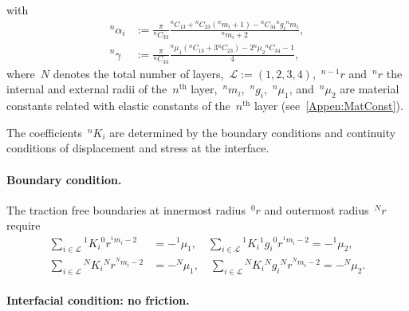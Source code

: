 \documentclass[preprint,10pt,times]{elsarticle}
\numberwithin{equation}{section}
\newcommand{\pr}[1]{\left( #1 \right)}
\renewcommand{\>}{$\Rightarrow$}
\begin{document}
with
\begin{subequations}
	\begin{align}
	{}^{n}\!{\alpha_{i}} & := \frac{\pi}{{}^{n}\!{C_{33}}} \frac{  {}^{n}\!{C_{13}} + {}^{n}\!{C_{23}}({}^{n}\!{m_{i}} + 1) - {}^{n}\!{C_{34}} {}^{n}\!{g_{i}} {}^{n}\!{m_{i}} }{{}^{n}\!{m_{i}}+2}, \\
	{}^{n}\!\gamma & := \frac{\pi}{{}^{n}\!{C_{33}}} \frac{ {}^{n}\!{\mu_{1}} ({}^{n}\!{C_{13}} + 3{}^{n}\!{C_{23}}) - 2{}^{n}\!{\mu_{2}} {}^{n}\!{C_{34}} - 1  }{4},
	\end{align}
\end{subequations}
where~$N$ denotes the total number of layers,~$\mathcal{L} := \pr{1,2,3,4}$,~${}^{n-1}\!{r}$ and~${}^{n}\!{r}$ the internal and external radii of the~$n^\text{th}$ layer,~${}^{n}\!{m_{i}}$,~${}^{n}\!{g_{i}}$,~${}^{n}\!{\mu_{1}}$, and~${}^{n}\!{\mu_{2}}$ are material constants related with elastic constants of the~$n^\text{th}$ layer (see~\ref{Appen:MatConst}).

The coefficients~${}^{n}\!{K_{i}}$ are determined by the boundary conditions and continuity conditions of displacement and stress at the interface.

\paragraph{Boundary condition.}

The traction free boundaries at innermost radius~${}^{0}\!{r}$ and outermost radius~${}^{N}\!{r}$ require
\begin{subequations}
	\begin{align}
	\sum_{i \in \mathcal{L}} {}^{1}\!{K_{i}} {}^{0}\!{r}^{{}^{1}\!{m_{i}}-2} & = -{}^{1}\!{\mu_{1}}, \quad
	\sum_{i \in \mathcal{L}} {}^{1}\!{K_{i}} {}^{1}\!{g_{i}} {}^{0}\!{r}^{{}^{1}\!{m_{i}}-2} = -{}^{1}\!{\mu_{2}},\\
	\sum_{i \in \mathcal{L}} {}^{N}\!{K_{i}} {}^{N}\!{r}^{{}^{N}\!{m_{i}}-2} & = -{}^{N}\!{\mu_{1}}, \quad
	\sum_{i \in \mathcal{L}} {}^{N}\!{K_{i}} {}^{N}\!{g_{i}} {}^{N}\!{r}^{{}^{N}\!{m_{i}}-2} = -{}^{N}\!{\mu_{2}}.
	\end{align}
	\label{eq:boundary}
\end{subequations}

\paragraph{Interfacial condition: no friction.}
\end{document}
